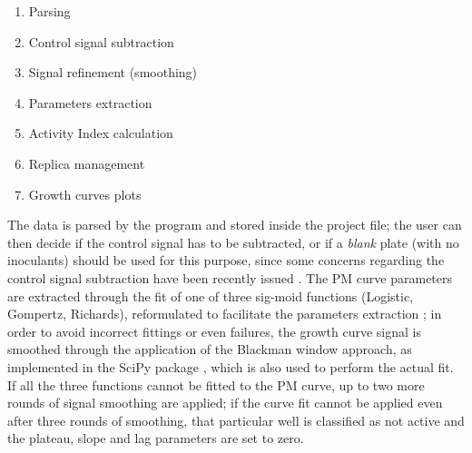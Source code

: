 \begin{enumerate}
\item Parsing
\item Control signal subtraction
\item Signal refinement (smoothing)
\item Parameters extraction 
\item Activity Index calculation
\item Replica management
\item Growth curves plots 
\end{enumerate}

The data is parsed by the program and stored inside the project file; the user can then decide if the control signal has to be subtracted, or if a \textit{blank} plate (with no inoculants) should be used for this purpose, since some concerns regarding the control signal subtraction have been recently issued \cite{vaas2012visualization}. The PM curve parameters are extracted through the fit of one of three sig-moid functions (Logistic, Gompertz, Richards), reformulated to facilitate the parameters extraction \cite{zwietering1990modeling}; in order to avoid incorrect fittings or even failures, the growth curve signal is smoothed through the application of the Blackman window approach, as implemented in the SciPy package \cite{jones2001scipy}, which is also used to perform the actual fit. If all the three functions cannot be fitted to the PM curve, up to two more rounds of signal smoothing are applied; if the curve fit cannot be applied even after three rounds of smoothing, that particular well is classified as not active and the plateau, slope and lag parameters are set to zero.
